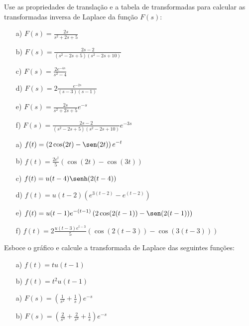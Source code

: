  \begin{exer}Use as propriedades de translação e a tabela de transformadas para calcular as transformadas inversa de Laplace da função $F(s)$:
 \begin{itemize}
  \item[a)] $\displaystyle F(s)=\frac{2s}{s^2+2s+5}$
    \item[b)] $\displaystyle F(s)=\frac{2s-2}{(s^2-2s+5)(s^2-2s+10)}$
  \item[c)] $\displaystyle F(s)=\frac{2e^{-4s}}{s^2-4}$
    \item[d)] $\displaystyle F(s)=2\frac{e^{-2s}}{(s-3)(s-1)}$
    \item[e)] $\displaystyle F(s)=\frac{2s}{s^2+2s+5}e^{-s}$
    \item[f)] $\displaystyle F(s)=\frac{2s-2}{(s^2-2s+5)(s^2-2s+10)}e^{-3s}$
 \end{itemize}
\end{exer}
\begin{resp}
\begin{itemize}
  \item[a)] $\displaystyle f(t)=\left(2\cos(2t)-\sen(2t)\right)e^{-t}$
      \item[b)] $\displaystyle f(t)=\frac{2e^{t}}{5}\left(\cos(2t)-\cos(3t)\right)$
        \item[c)] $\displaystyle f(t)=u(t-4)\senh(2(t-4))$
      \item[d)] $\displaystyle f(t)=u(t-2)\left(e^{3(t-2)}-e^{(t-2)}\right)$
        \item[e)] $\displaystyle f(t)=u(t-1)e^{-(t-1)}\left(2\cos(2(t-1))-\sen(2(t-1))\right)$
      \item[f)] $\displaystyle f(t)=2\frac{u(t-3)e^{t-3}}{5}\left(\cos(2(t-3))-\cos(3(t-3))\right)$
 \end{itemize}
\end{resp}
\begin{exer}Esboce o gráfico e calcule a transformada de Laplace das seguintes funções:
 \begin{itemize}
  \item[a)] $f(t)=tu(t-1)$
  \item[b)] $f(t)=t^2u(t-1)$
 \end{itemize}
\end{exer}
\begin{resp}
 \begin{itemize}
  \item[a)] $F(s)=\left(\frac{1}{s^2}+\frac{1}{s}\right)e^{-s}$
      \item[b)] $F(s)=\left(\frac{2}{s^3}+\frac{2}{s^2}+\frac{1}{s}\right)e^{-s}$
 \end{itemize}
\end{resp}
